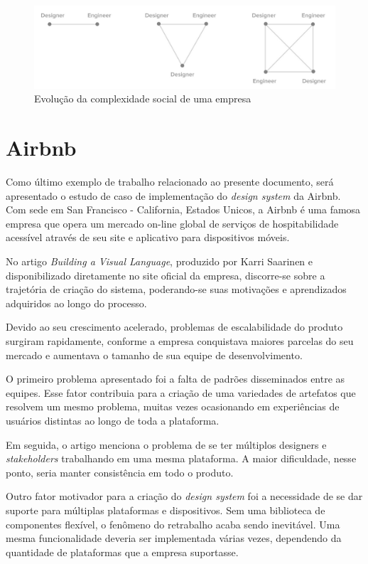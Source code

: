 \begin{figure}
	\includegraphics[width=\linewidth]{./04-figuras/03_trabalhos_relacionados/social-complexity.png}
    \caption{Evolução da complexidade social de uma empresa}
    \label{fig:socialComplexityIncrease}
\end{figure}

\section{Airbnb}
\label{sec:airbnb}

Como último exemplo de trabalho relacionado ao presente documento, será apresentado o estudo de caso de implementação do \textit{design system} da Airbnb. Com sede em San Francisco - California, Estados Unicos, a Airbnb é uma famosa empresa que opera um mercado on-line global de serviços de hospitabilidade acessível através de seu site e aplicativo para dispositivos móveis.

No artigo \textit{Building a Visual Language}, produzido por Karri Saarinen e disponibilizado diretamente no site oficial da empresa, discorre-se sobre a trajetória de criação do sistema, poderando-se suas motivações e aprendizados adquiridos ao longo do processo.

Devido ao seu crescimento acelerado, problemas de escalabilidade do produto surgiram rapidamente, conforme a empresa conquistava maiores parcelas do seu mercado e aumentava o tamanho de sua equipe de desenvolvimento.

O primeiro problema apresentado foi a falta de padrões disseminados entre as equipes. Esse fator contribuia para a criação de uma variedades de artefatos que resolvem um mesmo problema, muitas vezes ocasionando em experiências de usuários distintas ao longo de toda a plataforma.

Em seguida, o artigo menciona o problema de se ter múltiplos designers e \textit{stakeholders} trabalhando em uma mesma plataforma. A maior dificuldade, nesse ponto, seria manter consistência em todo o produto.

Outro fator motivador para a criação do \textit{design system} foi a necessidade de se dar suporte para múltiplas plataformas e dispositivos. Sem uma biblioteca de componentes flexível, o fenômeno do retrabalho acaba sendo inevitável. Uma mesma funcionalidade deveria ser implementada várias vezes, dependendo da quantidade de plataformas que a empresa suportasse.

